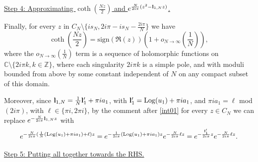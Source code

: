 \documentclass[11pt]{amsart}
\newcommand{\C}{\mathbb{C}}
\newcommand{\Z}{\mathbb{Z}}
\newcommand{\bl}{{\bf l}}
\newcommand{\Log}{{\rm Log}}
\newcommand{\ra}{\rightarrow}
\begin{document}
{\underline{Step 4: Approximating $\textstyle \coth\left(\frac{Nz}{2}\right)$ and $e^{\frac{N}{2i\pi} (z^2 - \bl_{1,N}z)}$.}

Finally, for every $z$ in $\textstyle C_N \setminus \{is_N,2i\pi-is_N - \frac{2i\pi}{N}\}$ we have
$$\coth\left(\frac{Nz}{2}\right) = \mathrm{sign}\left(\mathfrak{R}(z)\right) \left(1+ o_{N\ra \infty}\left(\frac{1}{N}\right)\right),$$ where the $\textstyle o_{N\ra \infty}\left(\frac{1}{N}\right)$ term is a sequence of holomorphic functions on $\C \setminus \{2i\pi k, k \in \Z\}$, where each singularity $2i\pi k$ is a simple pole, and with moduli bounded from above by some constant independent of $N$ on any compact subset of this domain. 

Moreover, since $\textstyle \bl_{1,N}= \frac{1}{N}{\bf l}'_1+\pi i a_1$, with ${\bf l}'_1 =\Log(u_{1}) +\pi ia_{1}$, and $\pi i a_1 = \ell$ mod$(2i\pi)$, with $\ell\in \{\pi i,2\pi i\}$, by the comment after \eqref{int01} for every $z\in C_N$ we can replace $e^{-\frac{N}{2i\pi}\bl_{1,N}z}$ with
$$e^{-\frac{N}{2i\pi}(\frac{1}{N}(\Log(u_{1}) +\pi ia_{1})+\ell) z} = e^{-\frac{1}{2i\pi}(\Log(u_{1}) +\pi ia_{1})z} e^{-\frac{N}{2i\pi}\ell z} = e^{-\frac{{\bf l}'_1}{2i\pi}z} e^{-\frac{N}{2i\pi}\ell z}.$$

\underline{Step 5: Putting all together towards the RHS.}

}
\end{document}
